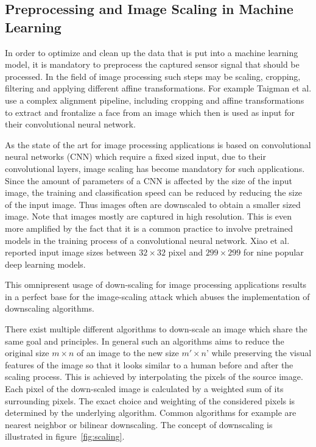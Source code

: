 \documentclass[sigconf]{acmart}
\begin{document}
\subsection{Preprocessing and Image Scaling in Machine Learning}
\label{sec:prepimgscale}
In order to optimize and clean up the data that is put into a machine learning model, it is mandatory to preprocess the captured sensor signal that should be processed.
In the field of image processing such steps may be scaling, cropping, filtering and applying different affine transformations.
For example Taigman et al.\cite{6909616} use a complex alignment pipeline, including cropping and affine transformations to extract and frontalize a face from an image which then is used as input for their convolutional neural network. 

As the state of the art for image processing applications is based on convolutional neural networks (CNN) which require a fixed sized input, due to their convolutional layers, image scaling has become mandatory for such applications.
Since the amount of parameters of a CNN is affected by the size of the input image, the training and classification speed can be reduced by reducing the size of the input image.
Thus images often are downscaled to obtain a smaller sized image.
Note that images mostly are captured in high resolution.
This is even more amplified by the fact that it is a common practice to involve pretrained models in the training process of a convolutional neural network.
Xiao et al.\cite{camouflage} reported input image sizes between $32  \times 32$ pixel and $299  \times 299$ for nine popular deep learning models.

This omnipresent usage of down-scaling for image processing applications results in a perfect base for the image-scaling attack which abuses the implementation of downscaling algorithms.

There exist multiple different algorithms to down-scale an image which share the same goal and principles.
In general such an algorithms aims to reduce the original size $m  \times n$ of an image to the new size $m' \times n$' while preserving the visual features of the image so that it looks similar to a human before and after the scaling process.
This is achieved by interpolating the pixels of the source image.
Each pixel of the down-scaled image is calculated by a weighted sum of its surrounding pixels.
The exact choice and weighting of the considered pixels is determined by the underlying algorithm.
Common algorithms for example are nearest neighbor or bilinear downscaling.
The concept of downscaling is illustrated in figure~\ref{fig:scaling}.
\end{document}
